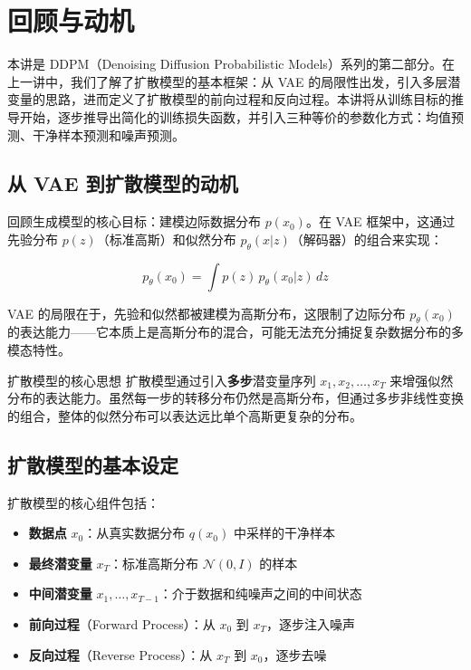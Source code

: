 \section{回顾与动机}

本讲是 DDPM（Denoising Diffusion Probabilistic Models）系列的第二部分。在上一讲中，我们了解了扩散模型的基本框架：从 VAE 的局限性出发，引入多层潜变量的思路，进而定义了扩散模型的前向过程和反向过程。本讲将从训练目标的推导开始，逐步推导出简化的训练损失函数，并引入三种等价的参数化方式：均值预测、干净样本预测和噪声预测。

\subsection{从 VAE 到扩散模型的动机}

回顾生成模型的核心目标：建模边际数据分布 $p(x_0)$。在 VAE 框架中，这通过先验分布 $p(z)$（标准高斯）和似然分布 $p_\theta(x|z)$（解码器）的组合来实现：

$$p_\theta(x_0) = \int p(z) \, p_\theta(x_0 | z) \, dz$$

VAE 的局限在于，先验和似然都被建模为高斯分布，这限制了边际分布 $p_\theta(x_0)$ 的表达能力——它本质上是高斯分布的混合，可能无法充分捕捉复杂数据分布的多模态特性。

\begin{importantbox}{扩散模型的核心思想}
扩散模型通过引入\textbf{多步}潜变量序列 $x_1, x_2, \dots, x_T$ 来增强似然分布的表达能力。虽然每一步的转移分布仍然是高斯分布，但通过多步非线性变换的组合，整体的似然分布可以表达远比单个高斯更复杂的分布。
\end{importantbox}

\subsection{扩散模型的基本设定}

扩散模型的核心组件包括：

\begin{itemize}
    \item \textbf{数据点} $x_0$：从真实数据分布 $q(x_0)$ 中采样的干净样本
    \item \textbf{最终潜变量} $x_T$：标准高斯分布 $\mathcal{N}(0, I)$ 的样本
    \item \textbf{中间潜变量} $x_1, \dots, x_{T-1}$：介于数据和纯噪声之间的中间状态
    \item \textbf{前向过程}（Forward Process）：从 $x_0$ 到 $x_T$，逐步注入噪声
    \item \textbf{反向过程}（Reverse Process）：从 $x_T$ 到 $x_0$，逐步去噪
\end{itemize}

